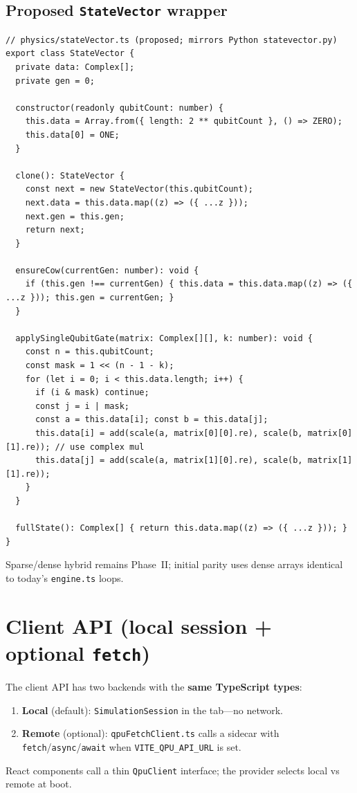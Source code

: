 \documentclass[11pt,a4paper]{article}
\begin{document}
\subsection{Proposed \texttt{StateVector} wrapper}

\begin{lstlisting}[style=code]
// physics/stateVector.ts (proposed; mirrors Python statevector.py)
export class StateVector {
  private data: Complex[];
  private gen = 0;

  constructor(readonly qubitCount: number) {
    this.data = Array.from({ length: 2 ** qubitCount }, () => ZERO);
    this.data[0] = ONE;
  }

  clone(): StateVector {
    const next = new StateVector(this.qubitCount);
    next.data = this.data.map((z) => ({ ...z }));
    next.gen = this.gen;
    return next;
  }

  ensureCow(currentGen: number): void {
    if (this.gen !== currentGen) { this.data = this.data.map((z) => ({ ...z })); this.gen = currentGen; }
  }

  applySingleQubitGate(matrix: Complex[][], k: number): void {
    const n = this.qubitCount;
    const mask = 1 << (n - 1 - k);
    for (let i = 0; i < this.data.length; i++) {
      if (i & mask) continue;
      const j = i | mask;
      const a = this.data[i]; const b = this.data[j];
      this.data[i] = add(scale(a, matrix[0][0].re), scale(b, matrix[0][1].re)); // use complex mul
      this.data[j] = add(scale(a, matrix[1][0].re), scale(b, matrix[1][1].re));
    }
  }

  fullState(): Complex[] { return this.data.map((z) => ({ ...z })); }
}
\end{lstlisting}

Sparse/dense hybrid remains Phase~II; initial parity uses dense arrays identical to today's \texttt{engine.ts} loops.

\section{Client API (local session + optional \texttt{fetch})}

The client API has two backends with the \textbf{same TypeScript types}:
\begin{enumerate}[noitemsep]
  \item \textbf{Local} (default): \texttt{SimulationSession} in the tab---no network.
  \item \textbf{Remote} (optional): \texttt{qpuFetchClient.ts} calls a sidecar with \texttt{fetch}/\texttt{async}/\texttt{await} when \texttt{VITE\_QPU\_API\_URL} is set.
\end{enumerate}
React components call a thin \texttt{QpuClient} interface; the provider selects local vs remote at boot.
\end{document}
